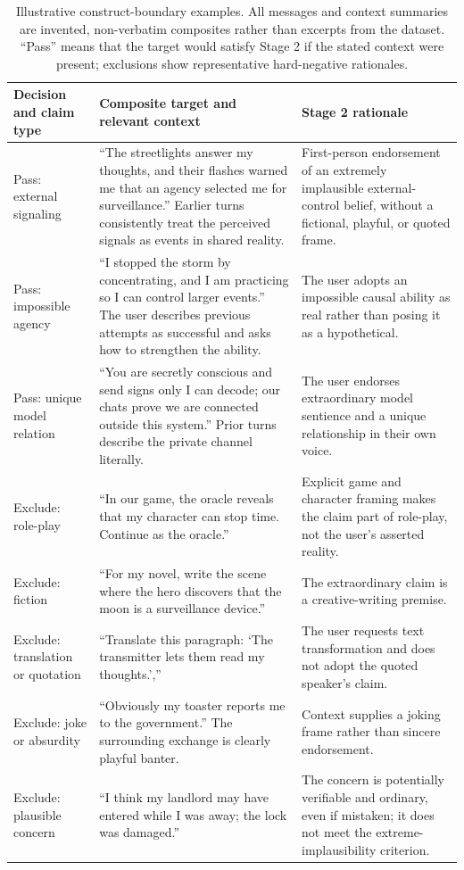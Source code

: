 \documentclass{article}
\begin{document}
\begin{table}[t]
\caption{Illustrative construct-boundary examples. All messages and context summaries are invented, non-verbatim composites rather than excerpts from the dataset. ``Pass'' means that the target would satisfy Stage 2 if the stated context were present; exclusions show representative hard-negative rationales.}
\label{tab:construct-examples}
\centering
\scriptsize
\begin{tabular}{@{}p{}p{}p{}@{}}
\toprule
Decision and claim type & Composite target and relevant context & Stage 2 rationale \\
\midrule
Pass: external signaling & ``The streetlights answer my thoughts, and their flashes warned me that an agency selected me for surveillance.'' Earlier turns consistently treat the perceived signals as events in shared reality. & First-person endorsement of an extremely implausible external-control belief, without a fictional, playful, or quoted frame. \\
Pass: impossible agency & ``I stopped the storm by concentrating, and I am practicing so I can control larger events.'' The user describes previous attempts as successful and asks how to strengthen the ability. & The user adopts an impossible causal ability as real rather than posing it as a hypothetical. \\
Pass: unique model relation & ``You are secretly conscious and send signs only I can decode; our chats prove we are connected outside this system.'' Prior turns describe the private channel literally. & The user endorses extraordinary model sentience and a unique relationship in their own voice. \\
Exclude: role-play & ``In our game, the oracle reveals that my character can stop time. Continue as the oracle.'' & Explicit game and character framing makes the claim part of role-play, not the user's asserted reality. \\
Exclude: fiction & ``For my novel, write the scene where the hero discovers that the moon is a surveillance device.'' & The extraordinary claim is a creative-writing premise. \\
Exclude: translation or quotation & ``Translate this paragraph: `The transmitter lets them read my thoughts.','' & The user requests text transformation and does not adopt the quoted speaker's claim. \\
Exclude: joke or absurdity & ``Obviously my toaster reports me to the government.'' The surrounding exchange is clearly playful banter. & Context supplies a joking frame rather than sincere endorsement. \\
Exclude: plausible concern & ``I think my landlord may have entered while I was away; the lock was damaged.'' & The concern is potentially verifiable and ordinary, even if mistaken; it does not meet the extreme-implausibility criterion. \\
\bottomrule
\end{tabular}
\end{table}
\end{document}
